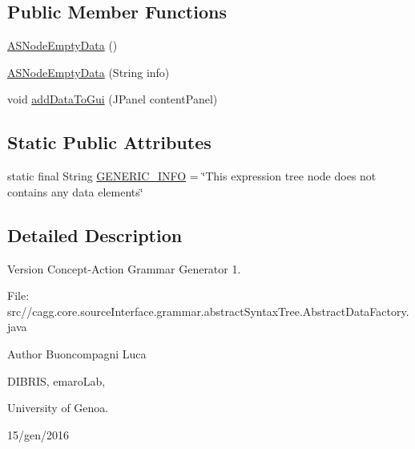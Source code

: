 \subsection*{Public Member Functions}
\begin{DoxyCompactItemize}
\item 
\hyperlink{classit_1_1emarolab_1_1cagg_1_1core_1_1language_1_1syntax_1_1abstractTree_1_1AbstractDataFactory_1_1ASNodeEmptyData_a350f37a01e40b51e0b5e60a42057144f}{A\-S\-Node\-Empty\-Data} ()
\item 
\hyperlink{classit_1_1emarolab_1_1cagg_1_1core_1_1language_1_1syntax_1_1abstractTree_1_1AbstractDataFactory_1_1ASNodeEmptyData_aa492a96df283890f434de51d0123db6b}{A\-S\-Node\-Empty\-Data} (String info)
\item 
void \hyperlink{classit_1_1emarolab_1_1cagg_1_1core_1_1language_1_1syntax_1_1abstractTree_1_1AbstractDataFactory_1_1ASNodeEmptyData_ae5df13b7c63943c1f1c61e844e76cb08}{add\-Data\-To\-Gui} (J\-Panel content\-Panel)
\end{DoxyCompactItemize}
\subsection*{Static Public Attributes}
\begin{DoxyCompactItemize}
\item 
static final String \hyperlink{classit_1_1emarolab_1_1cagg_1_1core_1_1language_1_1syntax_1_1abstractTree_1_1AbstractDataFactory_1_1ASNodeEmptyData_a4e40031c94fe7c1b692dffaf93abfd54}{G\-E\-N\-E\-R\-I\-C\-\_\-\-I\-N\-F\-O} = \char`\"{}This expression tree node does not contains any data elements\char`\"{}
\end{DoxyCompactItemize}


\subsection{Detailed Description}
\begin{DoxyVersion}{Version}
Concept-\/\-Action Grammar Generator 1. \par
 File\-: src//cagg.core.\-source\-Interface.\-grammar.\-abstract\-Syntax\-Tree.\-Abstract\-Data\-Factory.\-java \par

\end{DoxyVersion}
\begin{DoxyAuthor}{Author}
Buoncompagni Luca \par
 D\-I\-B\-R\-I\-S, emaro\-Lab,\par
 University of Genoa. \par
 15/gen/2016 \par

\end{DoxyAuthor}


